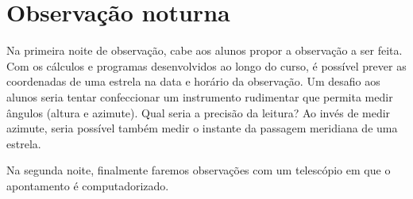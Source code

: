 \chapter{Observação noturna}

Na primeira noite de observação, cabe aos alunos propor a observação a ser feita. Com os cálculos e programas desenvolvidos ao longo do curso, é possível prever as coordenadas de uma estrela na data e horário da observação. Um desafio aos alunos seria tentar confeccionar um instrumento rudimentar que permita medir ângulos (altura e azimute). Qual seria a precisão da leitura? Ao invés de medir azimute, seria possível também medir o instante da passagem meridiana de uma estrela.

Na segunda noite, finalmente faremos observações com um telescópio em que o apontamento é computadorizado.
